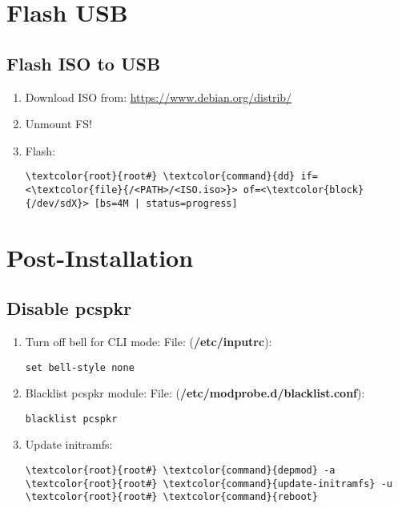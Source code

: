 \documentclass[10pt, a4paper, onecolumn, openany]{book} %
\begin{document}
\chapter{Flash USB}
\section{Flash ISO to USB}
\begin{enumerate}
    \item Download ISO from: \underline{\url{https://www.debian.org/distrib/}}
    \item Unmount FS!
    \item Flash:
\begin{Verbatim}[commandchars=\\\{\}]
\textcolor{root}{root#} \textcolor{command}{dd} if=<\textcolor{file}{/<PATH>/<ISO.iso>}> of=<\textcolor{block}{/dev/sdX}> [bs=4M | status=progress]
\end{Verbatim}
\end{enumerate}
\chapter{Post-Installation}
\section{Disable pcspkr}
\begin{enumerate}
    \item Turn off bell for CLI mode:
\newline File: (\textbf{\textcolor{file}{/etc/inputrc}}):
\begin{Verbatim}[commandchars=\\\{\}]
set bell-style none
\end{Verbatim}
    \item Blacklist pcspkr module:
\newline File: (\textbf{\textcolor{file}{/etc/modprobe.d/blacklist.conf}}):
\begin{Verbatim}[commandchars=\\\{\}]
blacklist pcspkr
\end{Verbatim}
    \item Update initramfs:
\begin{Verbatim}[commandchars=\\\{\}]
\textcolor{root}{root#} \textcolor{command}{depmod} -a
\textcolor{root}{root#} \textcolor{command}{update-initramfs} -u
\textcolor{root}{root#} \textcolor{command}{reboot}
\end{Verbatim}
\end{enumerate}
\end{document}

